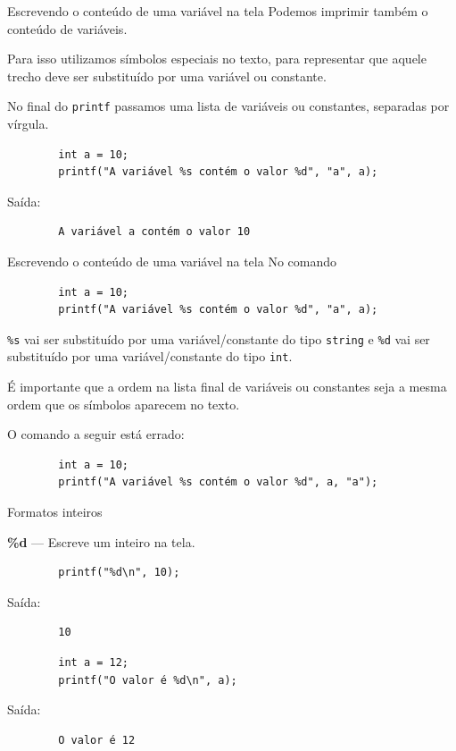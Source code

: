 \documentclass[handout]{beamer}
\newcommand{\cod}[1]{\texttt{#1}}
\begin{document}
\begin{frame}[fragile]{Escrevendo o conteúdo de uma variável na tela}
    Podemos imprimir também o conteúdo de variáveis.
    \pause
    
    Para isso utilizamos símbolos especiais no texto, para representar que aquele trecho deve ser substituído por uma variável ou constante.
    \pause
    
    No final do \cod{printf} passamos uma lista de variáveis ou constantes, separadas por vírgula.
    \pause

    \begin{verbatim}
        int a = 10;
        printf("A variável %s contém o valor %d", "a", a);
    \end{verbatim}
    
    Saída:
    \begin{verbatim}
        A variável a contém o valor 10
    \end{verbatim}
\end{frame}

\begin{frame}[fragile]{Escrevendo o conteúdo de uma variável na tela}
    No comando
    \begin{verbatim}
        int a = 10;
        printf("A variável %s contém o valor %d", "a", a);
    \end{verbatim}
    \texttt{\%s} vai ser substituído por uma variável/constante do tipo \cod{string} e \texttt{\%d} vai ser substituído por uma variável/constante do tipo \cod{int}.

    \pause
    É importante que a ordem na lista final de variáveis ou constantes seja a mesma ordem que os símbolos aparecem no texto.

    O comando a seguir está errado:
    \begin{verbatim}
        int a = 10;
        printf("A variável %s contém o valor %d", a, "a");
    \end{verbatim}

\end{frame}

\begin{frame}[fragile]{Formatos inteiros}

    \textbf{\%d} --- Escreve um inteiro na tela.

    \begin{verbatim}
        printf("%d\n", 10);
    \end{verbatim}
    Saída:
    \begin{verbatim}
        10
    \end{verbatim}

    \pause
    \begin{verbatim}
        int a = 12;
        printf("O valor é %d\n", a);
    \end{verbatim}
    Saída:
    \begin{verbatim}
        O valor é 12
    \end{verbatim}
\end{frame}
\end{document}

